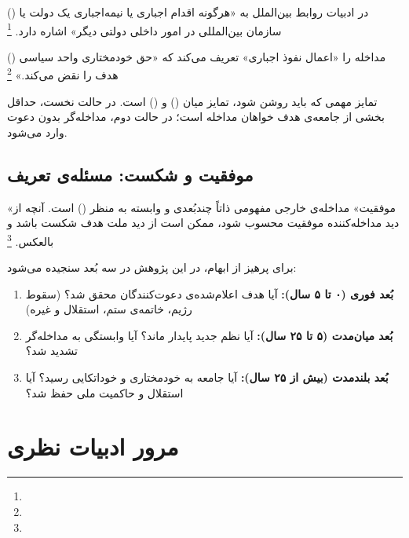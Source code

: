  () در ادبیات روابط بین‌الملل به «هرگونه اقدام اجباری یا نیمه‌اجباری یک دولت یا سازمان بین‌المللی در امور داخلی دولتی دیگر» اشاره دارد.%
\footnote{}

 () مداخله را «اعمال نفوذ اجباری» تعریف می‌کند که «حق خودمختاری واحد سیاسی هدف را نقض می‌کند.»%
\footnote{}

تمایز مهمی که باید روشن شود، تمایز میان  () و  () است. در حالت نخست، حداقل بخشی از جامعه‌ی هدف خواهان مداخله است؛ در حالت دوم، مداخله‌گر بدون دعوت وارد می‌شود.

\subsection{موفقیت و شکست: مسئله‌ی تعریف}
\label{subsec:ch01-def-success}

\begin{tcolorbox}[defbox, title={معضل تعریف «موفقیت»}]
«موفقیت» مداخله‌ی خارجی مفهومی ذاتاً چندبُعدی و وابسته به منظر () است. آنچه از دید مداخله‌کننده موفقیت محسوب شود، ممکن است از دید ملت هدف شکست باشد و بالعکس.%
\footnote{}
\end{tcolorbox}

برای پرهیز از ابهام، در این پژوهش  در سه بُعد سنجیده می‌شود:

\begin{enumerate}[nosep, label=\textbf{\arabic*.}]
  \item \textbf{بُعد فوری (۰ تا ۵ سال):} آیا هدف اعلام‌شده‌ی دعوت‌کنندگان محقق شد؟ (سقوط رژیم، خاتمه‌ی ستم، استقلال و غیره)
  \item \textbf{بُعد میان‌مدت (۵ تا ۲۵ سال):} آیا نظم جدید پایدار ماند؟ آیا وابستگی به مداخله‌گر تشدید شد؟
  \item \textbf{بُعد بلندمدت (بیش از ۲۵ سال):} آیا جامعه به خودمختاری و خوداتکایی رسید؟ آیا استقلال و حاکمیت ملی حفظ شد؟
\end{enumerate}

\section{مرور ادبیات نظری}
\label{sec:ch01-literature}

